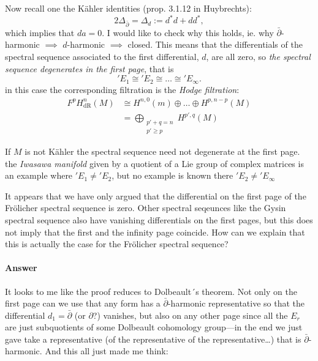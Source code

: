 Now recall one the K\"ahler identities (prop.
3.1.12 in Huybrechts):
$$2\Delta_{\bar\partial}=\Delta_d:=d^*d+dd^*,
$$
which implies that $da=0$. I would like to
check why this holds, ie. why
$\bar\partial$-harmonic $\implies$
$d$-harmonic $\implies$ closed. This means
that the differentials of the spectral
sequence associated to the first
differential, $d$, are all zero, so
\textit{the spectral sequence degenerates in
the first page}, that is
$$'E_1\cong 'E_2\cong \ldots\cong
'E_\infty.$$
in this case the corresponding filtration is
the {\it Hodge filtration}:
$$
\begin{aligned}
	F^pH^{n}_{\text{dR}}(M)&\cong
	H^{n,0}(m)\oplus\ldots\oplus H^{p,n-p}(M)\\
				       &=\bigoplus_{\substack{p'+q=n \\
				       p'\geq p}}  H^{p',q}(M)
\end{aligned}
$$
\begin{remark}
\label{remark-if-m-not-k-ahler-spect-seque}
If $M$ is not K\"ahler the spectral sequence
need not degenerate at the first page. the
{\it Iwasawa manifold} given by a quotient of
a Lie group of complex matrices is an example
where $'E_1\neq 'E_2$, but no example is
known there ${'E_2\neq 'E_\infty}$
\end{remark}

\begin{remark}[Altan]
\label{remark-altan}
	It appears that we have only argued that the
	differential on the first page of the
	Fr\"olicher spectral sequence is zero. Other
	spectral seqeunces like the Gysin spectral
	sequence also have vanishing differentials
	on the first pages, but this does not imply
	that the first and the infinity page
	coincide. How can we explain that this is
	actually the case for the Fr\"olicher
	spectral sequence?
\end{remark}

\paragraph{Answer}It looks to me like the
proof reduces to Dolbeault´s theorem. Not
only on the first page can we use that any
form has a $\bar\partial$-harmonic
representative so that the differential
$d_1=\bar\partial$ (or $\partial$?) vanishes,
but also on any other page since all the
$E_{r}$ are just subquotients of some
Dolbeault cohomology group---in the end we
just gave take a representative (of the
representative of the representative…) that
is $\bar\partial$-harmonic. And this all just
made me think:

